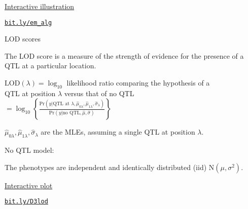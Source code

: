 \documentclass[aspectratio=169,12pt,t]{beamer}
\begin{document}
\begin{frame}[c]{\href{https://bit.ly/em_alg}{Interactive illustration}}


\href{https://bit.ly/em_alg}{\lolit \footnotesize \tt bit.ly/em\_alg}

\end{frame}



\begin{frame}[c]{LOD scores}

 The LOD score is a measure of the {\hilit strength of
evidence} for the presence of a QTL at a particular
location.

\bbi
\itemsep18pt

\item[] $\text{LOD}(\lambda) = \log_{10}$ likelihood ratio comparing the hypothesis of a \\

\hspace{25mm} QTL at position $\lambda$ versus that of no QTL \\[8pt]

\hspace{14mm} $= \log_{10} \left\{ \frac{\text{Pr}(y | \text{QTL at $\lambda$}, \hat{\mu}_{0\lambda},
\hat{\mu}_{1\lambda}, \hat{\sigma}_\lambda)}{\text{Pr}(y | \text{no QTL}, \hat{\mu},
\hat{\sigma})} \right\}$

 \item[] $\hat{\mu}_{0\lambda}, \hat{\mu}_{1\lambda}, \hat{\sigma}_\lambda$ are the MLEs,
assuming a single QTL at position $\lambda$.


 \item[] {\hilit No QTL model:}

\bi
  \item[] {\color{foreground} The phenotypes are independent and identically
distributed (iid) $\text{N}(\mu, \sigma^2)$}.
\ei

\ei

\end{frame}





\begin{frame}[c]{\href{https://bit.ly/D3lod}{Interactive plot}}


\href{https://bit.ly/D3lod}{\lolit \footnotesize \tt bit.ly/D3lod}

\end{frame}
\end{document}
